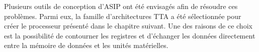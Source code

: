 Plusieurs outils de conception d'ASIP ont été envisagés afin de résoudre ces problèmes. Parmi eux, la famille d'architectures \og TTA \fg a été sélectionnée pour créer le processeur présenté dans le chapitre suivant. Une des raisons de ce choix est la possibilité de contourner les registres et d'échanger les données directement entre la mémoire de données et les unités matérielles.
